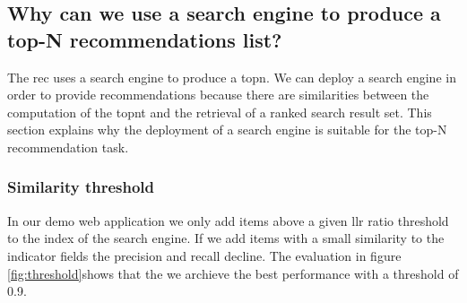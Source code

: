 \subsection{Why can we use a search engine to produce a top-N recommendations list?}
\label{sec:relation}

The \gls{rec} uses a search engine to produce a \gls{topn}. We can deploy a search engine in order to provide recommendations because there are similarities between the computation of the \gls{topnt} and the retrieval of a ranked search result set.
 This section explains why the deployment of a search engine is suitable for the top-N recommendation task.




\subsubsection{Similarity threshold}

In our demo web application we only add items above a given \gls{llr} ratio threshold to the index of the search engine. If we add items with a small similarity to the indicator fields the precision and recall decline. The evaluation in figure \ref{fig:threshold}shows that the we archieve the best performance with a threshold of 0.9.
